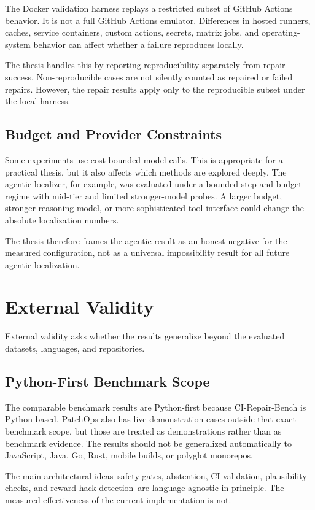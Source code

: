 The Docker validation harness replays a restricted subset of GitHub Actions behavior. It is not a full GitHub
Actions emulator. Differences in hosted runners, caches, service containers, custom actions, secrets, matrix
jobs, and operating-system behavior can affect whether a failure reproduces locally.

The thesis handles this by reporting reproducibility separately from repair success. Non-reproducible cases are
not silently counted as repaired or failed repairs. However, the repair results apply only to the reproducible
subset under the local harness.

\subsection{Budget and Provider Constraints}

Some experiments use cost-bounded model calls. This is appropriate for a practical thesis, but it also affects
which methods are explored deeply. The agentic localizer, for example, was evaluated under a bounded step and
budget regime with mid-tier and limited stronger-model probes. A larger budget, stronger reasoning model, or
more sophisticated tool interface could change the absolute localization numbers.

The thesis therefore frames the agentic result as an honest negative for the measured configuration, not as a
universal impossibility result for all future agentic localization.

\section{External Validity}

External validity asks whether the results generalize beyond the evaluated datasets, languages, and repositories.

\subsection{Python-First Benchmark Scope}

The comparable benchmark results are Python-first because CI-Repair-Bench is Python-based. PatchOps also has
live demonstration cases outside that exact benchmark scope, but those are treated as demonstrations rather
than as benchmark evidence. The results should not be generalized automatically to JavaScript, Java, Go, Rust,
mobile builds, or polyglot monorepos.

The main architectural ideas--safety gates, abstention, CI validation, plausibility checks, and reward-hack
detection--are language-agnostic in principle. The measured effectiveness of the current implementation is not.

